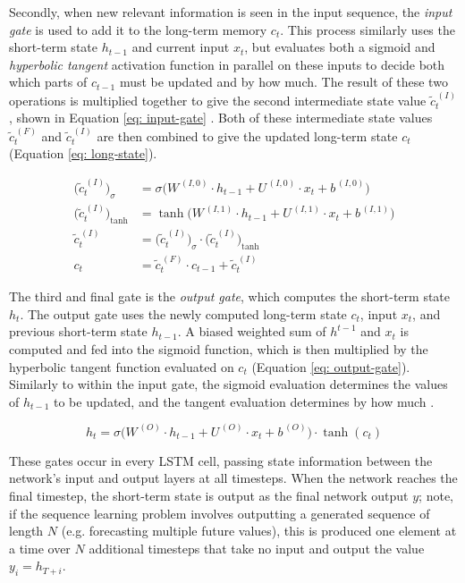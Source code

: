 \documentclass[a4paper, 11pt]{report}
\begin{document}
    Secondly, when new relevant information is seen in the input sequence, the \emph{input gate} is used to add it to the long-term memory $c_t$. This process similarly uses the short-term state $h_{t-1}$ and current input $x_t$, but evaluates both a sigmoid and \emph{hyperbolic tangent} activation function in parallel on these inputs to decide both which parts of $c_{t-1}$ must be updated and by how much. The result of these two operations is multiplied together to give the second intermediate state value $\tilde{c}^{\,(I)}_t$, shown in Equation \ref{eq: input-gate} \citep{zhang-2021}. Both of these intermediate state values $\tilde{c}^{\,(F)}_t$ and $\tilde{c}^{\,(I)}_t$ are then combined to give the updated long-term state $c_t$ (Equation \ref{eq: long-state}).

    \begin{align}
        \Big( \tilde{c}^{\,(I)}_t \Big)_{\sigma} &= \sigma \Big( W^{\,(I,0)} \cdot h_{t-1} + U^{\,(I,0)} \cdot x_t + b^{\,(I,0)} \Big) \\
        \Big( \tilde{c}^{\,(I)}_t \Big)_{\tanh} &= \tanh{\Big( W^{\,(I,1)} \cdot h_{t-1} + U^{\,(I,1)} \cdot x_t + b^{\,(I,1)} \Big)} \\
        \tilde{c}^{\,(I)}_t &= \Big( \tilde{c}^{\,(I)}_t \Big)_{\sigma} \cdot \Big( \tilde{c}^{\,(I)}_t \Big)_{\tanh}
        \label{eq: input-gate} \\
        c_t &= \tilde{c}^{\,(F)}_t \cdot c_{t-1} + \tilde{c}^{\,(I)}_t
        \label{eq: long-state}
    \end{align}

    The third and final gate is the \emph{output gate}, which computes the short-term state $h_t$. The output gate uses the newly computed long-term state $c_t$, input $x_t$, and previous short-term state $h_{t-1}$. A biased weighted sum of $h^{t-1}$ and $x_t$ is computed and fed into the sigmoid function, which is then multiplied by the hyperbolic tangent function evaluated on $c_t$ (Equation \ref{eq: output-gate}). Similarly to within the input gate, the sigmoid evaluation determines the values of $h_{t-1}$ to be updated, and the tangent evaluation determines by how much \citep{zhang-2021}.

    \begin{equation}
        \label{eq: output-gate}
        h_t = \sigma \Big( W^{\,(O)} \cdot h_{t-1} + U^{\,(O)} \cdot x_t + b^{\,(O)} \Big) \cdot \tanh{( c_t )}
    \end{equation}

    These gates occur in every LSTM cell, passing state information between the network's input and output layers at all timesteps. When the network reaches the final timestep, the short-term state is output as the final network output $y$; note, if the sequence learning problem involves outputting a generated sequence of length $N$ (e.g. forecasting multiple future values), this is produced one element at a time over $N$ additional timesteps that take no input and output the value $y_i = h_{T+i}$.
\end{document}
